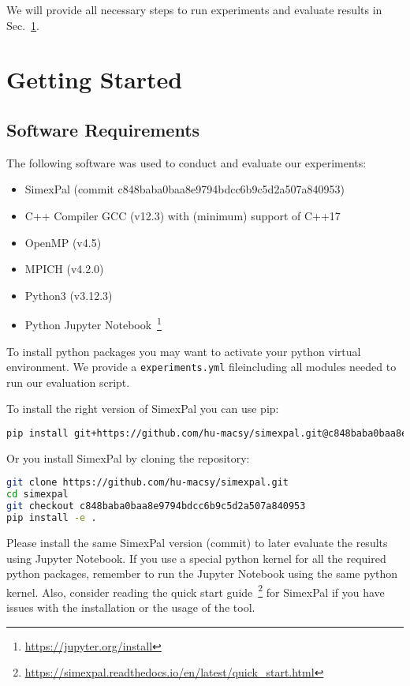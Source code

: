 \documentclass[11pt, a4paper]{scrartcl}
\newcommand{\expfile}{\texttt{experiments.yml} file}
\begin{document}
We will provide all necessary steps to run experiments and evaluate
results in Sec.~\ref{sec:getting_started}.

\section{Getting Started}\label{sec:getting_started}

\subsection{Software Requirements}

The following software was used to conduct and evaluate our experiments:

\begin{itemize}
    \item SimexPal (commit c848baba0baa8e9794bdcc6b9c5d2a507a840953)
    \item C++ Compiler GCC (v12.3) with (minimum) support of C++17
    \item OpenMP (v4.5)
    \item MPICH (v4.2.0)
    \item Python3 (v3.12.3)
    \item Python Jupyter Notebook~\footnote{\url{https://jupyter.org/install}}
\end{itemize}

To install python packages you may want to activate your python virtual
environment. We provide a \expfile including all modules
needed to run our evaluation script.

To install the right version of SimexPal you can use pip:

\begin{lstlisting}[language=bash]
pip install git+https://github.com/hu-macsy/simexpal.git@c848baba0baa8e9794bdcc6b9c5d2a507a840953
\end{lstlisting}

Or you install SimexPal by cloning the repository:

\begin{lstlisting}[language=bash]
git clone https://github.com/hu-macsy/simexpal.git
cd simexpal
git checkout c848baba0baa8e9794bdcc6b9c5d2a507a840953
pip install -e .
\end{lstlisting}

Please install the same SimexPal version (commit) to later evaluate the results
using Jupyter Notebook. If you use a special python kernel for all the required
python packages, remember to run the Jupyter Notebook using the same python
kernel. Also, consider reading the quick start
guide~\footnote{\url{https://simexpal.readthedocs.io/en/latest/quick_start.html}}
for SimexPal if you have issues with the installation or the usage of the tool.
\end{document}
